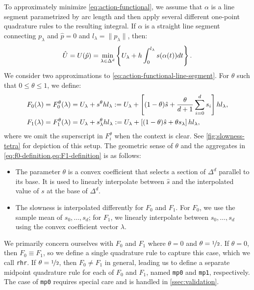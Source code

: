 \documentclass{article}
\begin{document}
To approximately minimize \cref{eq:action-functional}, we assume that
$\alpha$ is a line segment parametrized by arc length and then apply
several different one-point quadrature rules to the resulting
integral. If $\alpha$ is a straight line segment connecting
$p_\lambda$ and $\hat{p} = 0$ and $l_\lambda = \|p_\lambda\|$, then:
\begin{equation}
  \label{eq:action-functional-line-segment}
  \hat{U} = U(\hat{p}) = \min_{\lambda \in \Delta^d} \left\{U_\lambda + h \int_0^{l_\lambda} s(\alpha(t))dt\right\}.
\end{equation}
We consider two approximations to
\cref{eq:action-functional-line-segment}. For $\theta$ such that
$0 \leq \theta \leq 1$, we define:
\begin{align}
  F_0(\lambda) = F_0^\theta(\lambda) &= U_\lambda + s^{\theta} h l_\lambda := U_\lambda + \left[(1-\theta)\hat{s} + \frac{\theta}{d + 1} \sum_{i=0}^d s_i\right] h l_\lambda, \label{eq:f0-definition} \\
  F_1(\lambda) = F_1^\theta(\lambda) &= U_\lambda + s^{\theta}_\lambda h l_\lambda := U_\lambda + \left[(1-\theta)\hat{s} + \theta s_\lambda\right] h l_\lambda, \label{eq:F1-definition}
\end{align}
where we omit the superscript in $F_i^\theta$ when the context is
clear. See \cref{fig:slowness-tetra} for depiction of this setup. The
geometric sense of $\theta$ and the aggregates in
\cref{eq:f0-definition,eq:F1-definition} is as follows:
\begin{itemize}
\item The parameter $\theta$ is a convex coefficient that selects a
  section of $\Delta^d$ parallel to its base. It is used to linearly
  interpolate between $\hat{s}$ and the interpolated value of $s$ at
  the base of $\Delta^d$.
\item The slowness is interpolated differently for $F_0$ and
  $F_1$. For $F_0$, we use the sample mean of $s_0, \hdots, s_d$; for
  $F_1$, we linearly interpolate between $s_0, \hdots, s_d$ using the
  convex coefficient vector $\lambda$.
\end{itemize}

We primarily concern ourselves with $F_0$ and $F_1$ where $\theta = 0$
and $\theta = \nicefrac{1}{2}$.  If $\theta = 0$, then
$F_0 \equiv F_1$, so we define a single quadrature rule to capture
this case, which we call \texttt{rhr}. If $\theta = \nicefrac{1}{2}$,
then $F_0 \neq F_1$ in general, leading us to define a separate
midpoint quadrature rule for each of $F_0$ and $F_1$, named
\texttt{mp0} and \texttt{mp1}, respectively. The case of \texttt{mp0}
requires special care and is handled in \cref{ssec:validation}.
\end{document}

